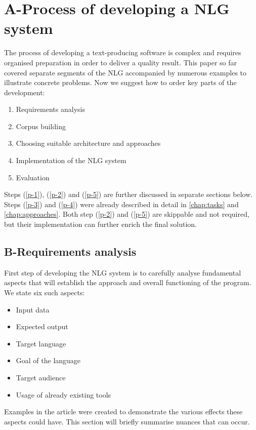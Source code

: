\chapter{A-Process of developing a NLG system}\label{chap:process}

The process of developing a text-producing software is complex and requires organised preparation in order to deliver a quality result. This paper so far covered separate segments of the NLG accompanied by numerous examples to illustrate concrete problems. Now we suggest how to order key parts of the development:
\begin{enumerate}
	\item Requirements analysis \label{p-1}
	\item Corpus building \label{p-2}
	\item Choosing suitable architecture and approaches \label{p-3}
	\item Implementation of the NLG system \label{p-4}
	\item Evaluation \label{p-5}
\end{enumerate}

Steps (\ref{p-1}), (\ref{p-2}) and (\ref{p-5}) are further discussed in separate sections below. Steps (\ref{p-3}) and (\ref{p-4}) were already described in detail in \autoref{chap:tasks} and \autoref{chap:approaches}. Both step (\ref{p-2}) and (\ref{p-5}) are skippable and not required, but their implementation can further enrich the final solution.

\section{B-Requirements analysis}

First step of developing the NLG system is to carefully analyse fundamental aspects that will establish the approach and overall functioning of the program. We state six such aspects:
\begin{itemize}
	\item Input data
	\item Expected output
	\item Target language
	\item Goal of the language 
	\item Target audience
	\item Usage of already existing tools  
\end{itemize}

Examples in the article were created to demonstrate the various effects these aspects could have. This section will briefly summarise nuances that can occur. 

